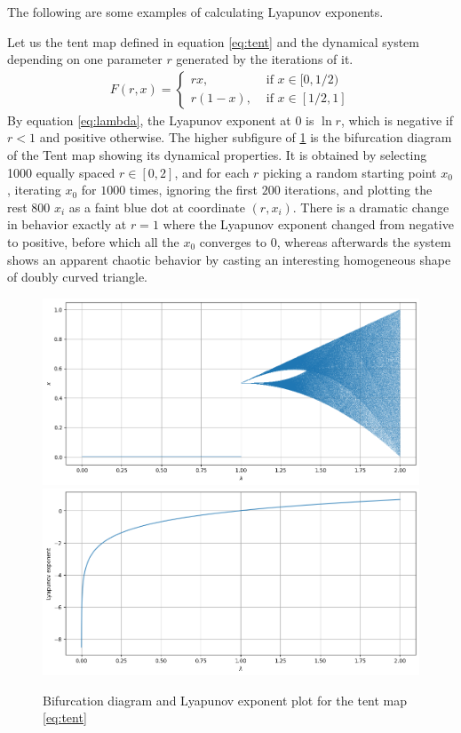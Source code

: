 The following are some examples of calculating Lyapunov exponents.

\begin{exmp}
	Let us the tent map defined in equation \eqref{eq:tent} and the dynamical system depending on one parameter $r$ generated by the iterations of it.
    \begin{align}
        F(r, x)= 
        \begin{cases}
            r x, & \text{ if } x \in [0,1/2) \\
            r (1-x), & \text{ if } x \in [1/2,1]
        \end{cases} \label{eq:tent}
    \end{align}
	By equation \eqref{eq:lambda}, the Lyapunov exponent at $0$ is $\ln r$, which is negative if $r < 1$ and positive otherwise.
	The higher subfigure of \ref{fig:lyapunov_tent} is the bifurcation diagram of the Tent map showing its dynamical properties. 
	It is obtained by selecting 1000 equally spaced $r \in [0,2]$, and for each $r$ picking a random starting point $x_0$, iterating $x_0$ for $1000$ times, ignoring the first $200$ iterations, and plotting the rest $800$ $ x_i$ as a faint blue dot at coordinate $(r, x_i)$. 
	There is a dramatic change in behavior exactly at $r=1$ where the Lyapunov exponent changed from negative to positive, before which all the $x_0$ converges to $0$, whereas afterwards the system shows an apparent chaotic behavior by casting an interesting homogeneous shape of doubly curved triangle.

    \begin{figure}
        \centering
        \includegraphics[width=\linewidth]{Bifurcation Images/Bifurcation_tent.png}
        \includegraphics[width=\linewidth]{Bifurcation Images/Lyapunov_Tent.png}
        \caption{Bifurcation diagram and Lyapunov exponent plot for the tent map \eqref{eq:tent}}
        \label{fig:lyapunov_tent}
    \end{figure}
\end{exmp}

